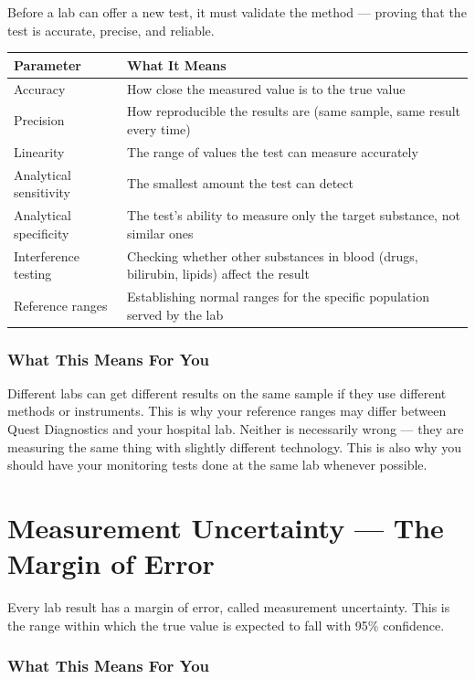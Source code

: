 Before a lab can offer a new test, it must validate the method --- proving that the test is accurate, precise, and reliable.

\begin{longtable}{@{}p{4.5cm}p{10.5cm}@{}}
\toprule
\textbf{Parameter} & \textbf{What It Means} \\
\midrule
Accuracy & How close the measured value is to the true value \\
Precision & How reproducible the results are (same sample, same result every time) \\
Linearity & The range of values the test can measure accurately \\
Analytical sensitivity & The smallest amount the test can detect \\
Analytical specificity & The test's ability to measure only the target substance, not similar ones \\
Interference testing & Checking whether other substances in blood (drugs, bilirubin, lipids) affect the result \\
Reference ranges & Establishing normal ranges for the specific population served by the lab \\
\bottomrule
\end{longtable}

\subsubsection{What This Means For You}

Different labs can get different results on the same sample if they use different methods or instruments. This is why your reference ranges may differ between Quest Diagnostics and your hospital lab. Neither is necessarily wrong --- they are measuring the same thing with slightly different technology. This is also why you should have your monitoring tests done at the same lab whenever possible.

\clearpage
\section{Measurement Uncertainty --- The Margin of Error}

Every lab result has a margin of error, called measurement uncertainty. This is the range within which the true value is expected to fall with 95\% confidence.

\subsubsection{What This Means For You}


